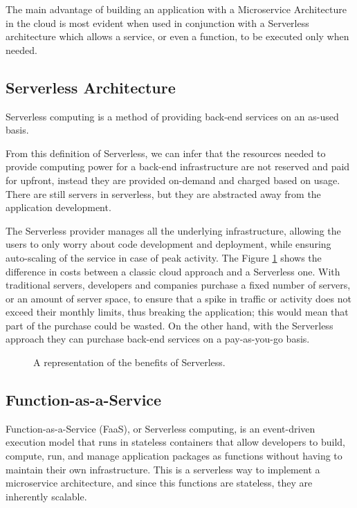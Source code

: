 The main advantage of building an application with a Microservice Architecture in the cloud is most evident when used in conjunction with a Serverless architecture which allows a service, or even a function, to be executed only when needed.

\subsection{Serverless Architecture}
\begin{definition}
Serverless computing is a method of providing back-end services on an as-used basis.\cite{sls}
\end{definition}

From this definition of Serverless, we can infer that the resources needed to provide computing power for a back-end infrastructure are not reserved and paid for upfront, instead they are provided on-demand and charged based on usage. There are still servers in serverless, but they are abstracted away from the application development.

The Serverless provider manages all the underlying infrastructure, allowing the users to only worry about code development and deployment, while ensuring auto-scaling of the service in case of peak activity. The Figure \ref{fig:serverless_benefits} shows the difference in costs between a classic cloud approach and a Serverless one. With traditional servers, developers and companies purchase a fixed number of servers, or an amount of server space, to ensure that a spike in traffic or activity does not exceed their monthly limits, thus breaking the application; this would mean that part of the purchase could be wasted. On the other hand, with the Serverless approach they can purchase back-end services on a pay-as-you-go basis.



\begin{figure}[!htb]
    \centering
    
    \caption{A representation of the benefits of Serverless. \cite{sls}}
    \label{fig:serverless_benefits}
\end{figure}



\subsection{Function-as-a-Service} \label{FaaS}
Function-as-a-Service (FaaS), or Serverless computing, is an event-driven execution model that runs in stateless containers that allow developers to build, compute, run, and manage application packages as functions without having to maintain their own infrastructure. This is a serverless way to implement a microservice architecture, and since this functions are stateless, they are inherently scalable.

